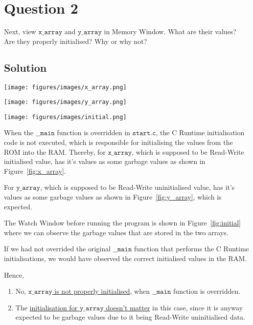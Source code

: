 \section*{Question 2}

Next, view \(\texttt{x\_array}\) and \(\texttt{y\_array}\) in Memory Window.
What are their values?\\
Are they properly initialised?
Why or why not?

\subsection*{Solution}

\begin{figure*}[htbp]
    \centering
    \texttt{[image: figures/images/x\_array.png]}
    \caption{
        Memory Window for \texttt{x\_array}.
    }\label{fig:x_array}
\end{figure*}

\begin{figure*}[htbp]
    \centering
    \texttt{[image: figures/images/y\_array.png]}
    \caption{
        Memory Window for \texttt{y\_array}.
    }\label{fig:y_array}
\end{figure*}

\begin{figure*}[htbp]
    \centering
    \texttt{[image: figures/images/initial.png]}
    \caption{
        Watch window before running the program.
    }\label{fig:initial}
\end{figure*}

When the \( \texttt{\_\_main} \) function is overridden in \( \texttt{start.c} \), the C Runtime initialisation code is not executed, which is responsible for initialising the values from the ROM into the RAM.\@
Thereby, for \( \texttt{x\_array} \), which is supposed to be Read-Write initialised value, has it's values as some garbage values as shown in Figure~\ref{fig:x_array}.

For \( \texttt{y\_array} \), which is supposed to be Read-Write uninitialised value, has it's values as some garbage values as shown in Figure~\ref{fig:y_array}, which is expected.

The Watch Window before running the program is shown in Figure~\ref{fig:initial} where we can observe the garbage values that are stored in the two arrays.

If we had not overrided the original \( \texttt{\_\_main} \) function that performs the C Runtime initialisations, we would have observed the correct initialised values in the RAM.\@

Hence,
\begin{enumerate}[itemsep=0pt, topsep=0pt, partopsep=0pt, parsep=0pt]
    \item No, \underline{\( \texttt{x\_array} \) is not properly initialised}, when \( \texttt{\_\_main} \) function is overridden.
    \item The \underline{initialisation for \( \texttt{y\_array} \) doesn't matter} in this case, since it is anyway expected to be garbage values due to it being Read-Write uninitialised data.
\end{enumerate}
